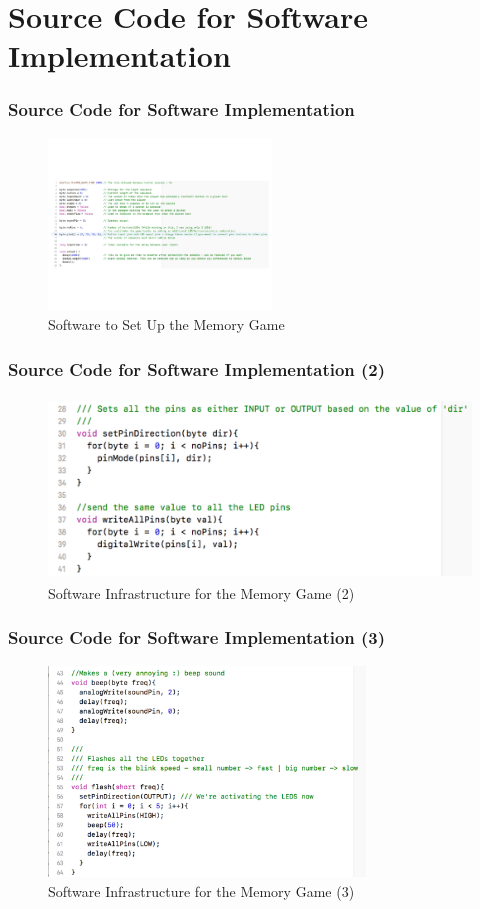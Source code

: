 \documentclass[xcolor={usenames,dvipsnames},hyperref={hyperindex,bookmarks}]{beamer}
\begin{document}
\section{Source Code for Software Implementation}

\frame
{
	\frametitle{Source Code for Software Implementation}

\begin{figure}[h]
\centering 
\includegraphics[height=1.80in]{./pics/sw-setup}
\caption{Software to Set Up the Memory Game}
\label{fig:swsetup}
\end{figure}
}



\frame
{
	\frametitle{Source Code for Software Implementation (2)}

\begin{figure}[h]
\centering 
\includegraphics[height=1.90in]{./pics/sw-infrastructure}
\caption{Software Infrastructure for the Memory Game (2)}
\label{fig:swinfrastructure}
\end{figure}
}




\frame
{
	\frametitle{Source Code for Software Implementation (3)}

\begin{figure}[h]
\centering 
\includegraphics[height=2.2in]{./pics/sw-infrastructure2}
\caption{Software Infrastructure for the Memory Game (3)}
\label{fig:swinfrastructure2}
\end{figure}
}
\end{document}
